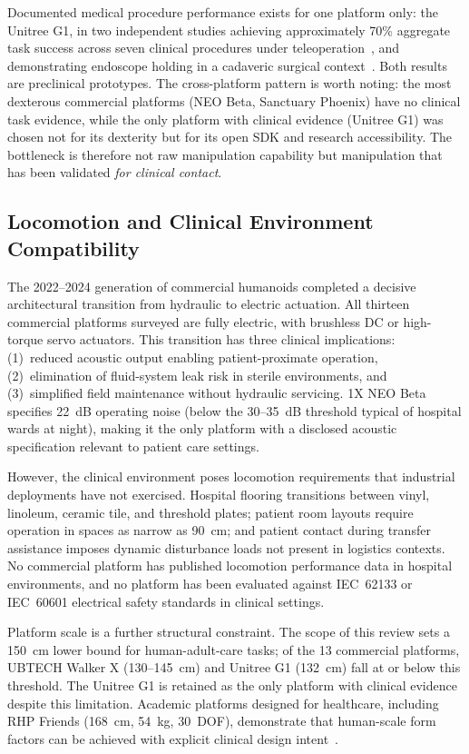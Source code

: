 Documented medical procedure performance exists for one platform only: the
Unitree G1, in two independent studies achieving approximately 70\% aggregate
task success across seven clinical procedures under teleoperation~\cite{atar2025humanoids},
and demonstrating endoscope holding in a cadaveric surgical context~\cite{cho2026humanoid}.
Both results are preclinical prototypes. The cross-platform pattern is worth
noting: the most dexterous commercial platforms (NEO Beta, Sanctuary Phoenix)
have no clinical task evidence, while the only platform with clinical evidence
(Unitree G1) was chosen not for its dexterity but for its open SDK and research
accessibility. The bottleneck is therefore not raw manipulation capability but
manipulation that has been validated \emph{for clinical contact}.

\subsection{Locomotion and Clinical Environment Compatibility}
\label{sec:locomotion}

The 2022--2024 generation of commercial humanoids completed a decisive architectural
transition from hydraulic to electric actuation. All thirteen commercial platforms
surveyed are fully electric, with brushless DC or high-torque servo actuators.
This transition has three clinical implications: (1)~reduced acoustic output
enabling patient-proximate operation, (2)~elimination of fluid-system leak risk
in sterile environments, and (3)~simplified field maintenance without hydraulic
servicing. 1X NEO Beta specifies 22~dB operating noise (below the 30--35~dB
threshold typical of hospital wards at night), making it the only platform with
a disclosed acoustic specification relevant to patient care settings.

However, the clinical environment poses locomotion requirements that industrial
deployments have not exercised. Hospital flooring transitions between vinyl,
linoleum, ceramic tile, and threshold plates; patient room layouts require
operation in spaces as narrow as 90~cm; and patient contact during transfer
assistance imposes dynamic disturbance loads not present in logistics contexts.
No commercial platform has published locomotion performance data in hospital
environments, and no platform has been evaluated against IEC~62133 or IEC~60601
electrical safety standards in clinical settings.

Platform scale is a further structural constraint. The scope of this review sets
a 150~cm lower bound for human-adult-care tasks; of the 13 commercial platforms,
UBTECH Walker X (130--145~cm) and Unitree G1 (132~cm) fall at or below this
threshold. The Unitree G1 is retained as the only platform with clinical evidence
despite this limitation. Academic platforms designed for healthcare, including
RHP Friends (168~cm, 54~kg, 30~DOF), demonstrate that human-scale form factors
can be achieved with explicit clinical design intent~\cite{benallegue2025rhp}.

